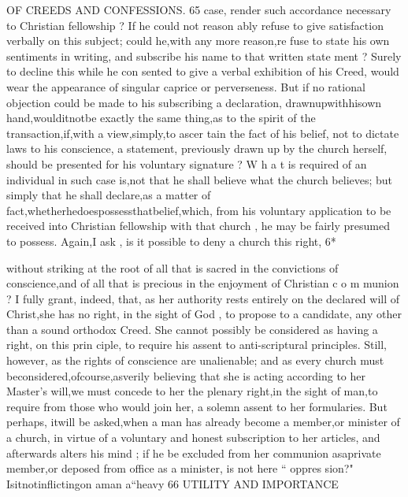 \documentclass[
]{book}
\begin{document}
OF CREEDS AND CONFESSIONS. 65
case, render such accordance necessary to Christian fellowship ? If he could not reason
ably refuse to give satisfaction verbally on this subject; could he,with any more reason,re fuse to state his own sentiments in writing, and subscribe his name to that written state
ment ? Surely to decline this while he con sented to give a verbal exhibition of his Creed, would wear the appearance of singular caprice or perverseness. But if no rational objection could be made to his subscribing a declaration, drawnupwithhisown hand,woulditnotbe exactly the same thing,as to the spirit of the transaction,if,with a view,simply,to ascer tain the fact of his belief, not to dictate laws to his conscience, a statement, previously
drawn up by the church herself, should be presented for his voluntary signature ? W h a t is required of an individual in such case is,not that he shall believe what the church believes;
but simply that he shall declare,as a matter of fact,whetherhedoespossessthatbelief,which, from his voluntary application to be received into Christian fellowship with that church , he
may be fairly presumed to possess. Again,I ask , is it possible to deny a church this right,
6*

without striking at the root of all that is sacred in the convictions of conscience,and of all that
is precious in the enjoyment of Christian c o m munion ? I fully grant, indeed, that, as her authority rests entirely on the declared will of
Christ,she has no right, in the sight of God ,
to propose to a candidate, any other than a
sound orthodox Creed. She cannot possibly
be considered as having a right, on this prin
ciple, to require his assent to anti-scriptural
principles. Still, however, as the rights of conscience are unalienable; and as every
church must beconsidered,ofcourse,asverily
believing that she is acting according to her Master's will,we must concede to her the
plenary right,in the sight of man,to require from those who would join her, a solemn assent to her formularies.
But perhaps, itwill be asked,when a man has already become a member,or minister of a church, in virtue of a voluntary and honest subscription to her articles, and afterwards
alters his mind ; if he be excluded from her communion asaprivate member,or deposed
from office as a minister, is not here `` oppres sion?" Isitnotinflictingon aman a``heavy
66 UTILITY AND IMPORTANCE
\end{document}
